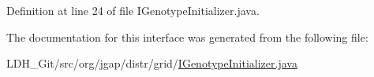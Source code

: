 Definition at line 24 of file I\-Genotype\-Initializer.\-java.



The documentation for this interface was generated from the following file\-:\begin{DoxyCompactItemize}
\item 
L\-D\-H\-\_\-\-Git/src/org/jgap/distr/grid/\hyperlink{_i_genotype_initializer_8java}{I\-Genotype\-Initializer.\-java}\end{DoxyCompactItemize}
